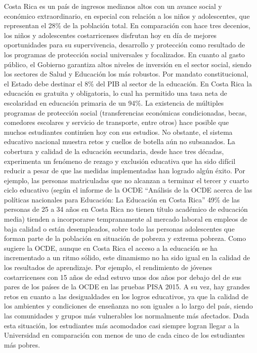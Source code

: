 \documentclass[a4paper, 9pt, conference]{article}              %
\theoremstyle{definition}
\begin{document}
Costa Rica es un pa\'is de ingresos medianos altos con un avance social y econ\'omico extraordinario, en especial con relaci\'on a los ni\~nos y adolescentes, que representan el 28\% de la poblaci\'on total. En comparaci\'on con hace tres decenios, los ni\~nos y adolescentes costarricenses disfrutan hoy en d\'ia de mejores oportunidades para su supervivencia, desarrollo y protecci\'on como resultado de los programas de protecci\'on social universales y focalizados. En cuanto al gasto p\'ublico, el Gobierno garantiza altos niveles de inversi\'on en el sector social, siendo los sectores de Salud y Educaci\'on los m\'as robustos. Por mandato constitucional, el Estado debe destinar el 8\% del PIB al sector de la educaci\'on. En Costa Rica la educaci\'on es gratuita y obligatoria, lo cual ha permitido una tasa neta de escolaridad en educaci\'on primaria de un 94\%. La existencia de m\'ultiples programas de protecci\'on social (transferencias econ\'omicas condicionadas, becas, comedores escolares y servicio de transporte, entre otros) hace posible que muchos estudiantes contin\'uen hoy con sus estudios. No obstante, el sistema educativo nacional muestra retos y cuellos de botella a\'un no subsanados. La cobertura y calidad de la educaci\'on secundaria, desde hace tres d\'ecadas, experimenta un fen\'omeno de rezago y exclusi\'on educativa que ha sido dif\'icil reducir a pesar de que las medidas implementadas han logrado alg\'un \'exito. Por ejemplo, las personas matriculadas que no alcanzan a terminar el tercer y cuarto ciclo educativo (seg\'un el informe de la OCDE ``An\'alisis de la OCDE acerca de las pol\'iticas nacionales para Educaci\'on: La Educaci\'on en Costa Rica'' 49\% de las personas de 25 a 34 a\~nos en Costa Rica no tienen t\'itulo acad\'emico de educaci\'on media) tienden a incorporarse tempranamente al mercado laboral en empleos de baja calidad o est\'an desempleados, sobre todo las personas adolescentes que forman parte de la poblaci\'on en situaci\'on de pobreza y extrema pobreza. Como sugiere la OCDE, aunque en Costa Rica el acceso a la educaci\'on se ha incrementado a un ritmo s\'olido, este dinamismo no ha sido igual en la calidad de los resultados de aprendizaje. Por ejemplo, el rendimiento de j\'ovenes costarricenses con 15 a\~nos de edad estuvo unos dos a\~nos por debajo del de sus pares de los pa\'ises de la OCDE en las pruebas PISA 2015. A su vez, hay grandes retos en cuanto a las desigualdades en los logros educativos, ya que la calidad de los ambientes y condiciones de ense\~nanza no son iguales a lo largo del pa\'is, siendo las comunidades y grupos m\'as vulnerables los normalmente m\'as afectados. Dada esta situaci\'on, los estudiantes m\'as acomodados casi siempre logran llegar a la Universidad en comparaci\'on con menos de uno de cada cinco de los estudiantes m\'as pobres.
\end{document}
